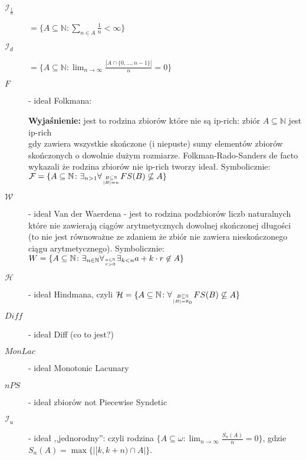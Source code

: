 \documentclass[12pt]{article}
\theoremstyle{plain}
\theoremstyle{definition}
\theoremstyle{remark}
\newcommand{\nnatural}{\mathbb{N}}
\begin{document}
\begin{description}
\item[$\mathcal{I}_{\frac{1}{n}}$] $= \lbrace A \subseteq \nnatural\colon
\sum_{n\in A} \frac{1}{n} < \infty\rbrace$

\item[$\mathcal{I}_{d}$] $= \lbrace A \subseteq \nnatural\colon
\lim_{n\to\infty} \frac{|A \cap \lbrace 0,\ldots, n-1\rbrace|}{n} = 0\rbrace$

\item[$\mathit{F}$] -  ideał Folkmana:

{\bf Wyjaśnienie:} jest to rodzina zbiorów które nie są ip-rich: zbiór $A\subseteq\nnatural$
jest ip-rich \\gdy zawiera 
wszystkie skończone (i niepuste) sumy 
elementów zbiorów skończonych o dowolnie dużym rozmiarze.
Folkman-Rado-Sanders de facto wykazali że rodzina zbiorów nie ip-rich 
tworzy ideał.
Symbolicznie: 
$\mathcal{F} = \lbrace A \subseteq \nnatural \colon \exists_{n > 1} 
\forall_{B \subseteq \nnatural \atop |B| = n} FS(B) \not \subseteq A \rbrace$ 
\item[$\mathcal{W}$] -  ideał Van der Waerdena - jest to rodzina
  podzbiorów liczb naturalnych które nie zawierają ciągów arytmetycznych
  dowolnej skończonej długości (to nie jest równoważne ze zdaniem
  że zbiór nie zawiera nieskończonego ciągu arytmetycznego).
  Symbolicznie: $W = \lbrace A \subseteq \nnatural \colon
  \exists_{n\in\nnatural} \forall_{a\in\nnatural \atop r > 0 }
  \exists_{k < n} a + k \cdot r \not\in A \rbrace$
\item[$\mathcal{H}$] -  ideał Hindmana, 
czyli $\mathcal{H} = \lbrace A \subseteq \nnatural \colon
\forall_{B \subseteq \nnatural \atop |B| = \aleph_0} 
FS(B) \not\subseteq A\rbrace$
\item[$\mathit{Diff}$] -  ideał Diff (co to jest?)
\item[$\mathit{MonLac}$] - ideał Monotonic Lacunary
\item[$\mathit{nPS}$] - ideał zbiorów not Piecewise Syndetic
\item[$\mathcal{I}_u$] - ideał ,,jednorodny'':
czyli rodzina $\lbrace A \subseteq \omega \colon \lim_{n\to\infty} \frac{S_n(A)}{n} = 0\rbrace$,
gdzie $S_n(A) = \max\lbrace |[k, k + n) \cap A|\rbrace$.

\end{description}
\end{document}
